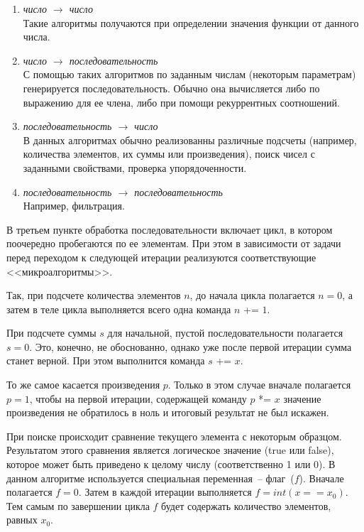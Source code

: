 \begin{enumerate}
	\item \emph{число $\rightarrow$ число}\\
	Такие алгоритмы получаются при определении значения функции от данного числа.
	\item \emph{число $\rightarrow$ последовательность}\\
	С помощью таких алгоритмов по заданным числам (некоторым параметрам) генерируется последовательность. Обычно она вычисляется либо по выражению для ее члена, либо при помощи рекуррентных соотношений.
	\item \emph{последовательность $\rightarrow$ число}\\
	В данных алгоритмах обычно реализованны различные подсчеты (например, количества элементов, их  суммы или произведения), поиск чисел с заданными свойствами, проверка упорядоченности.
	\item \emph{последовательность $\rightarrow$ последовательность}\\
	Например, фильтрация.
\end{enumerate}

В третьем пункте обработка последовательности включает цикл, в котором поочередно пробегаются по ее элементам. При этом в зависимости от задачи перед переходом к следующей итерации реализуются соответствующие <<микроалгоритмы>>.

Так, при подсчете количества элементов $n$, до начала  цикла полагается $n=0$, а затем в теле цикла выполняется всего одна команда $n$ += $1$.

При подсчете суммы $s$  для начальной, пустой последовательности полагается $s=0$. Это, конечно, не обоснованно, однако уже после первой итерации сумма станет верной. При этом выполнится команда $s$ += $x$.

То же самое касается произведения $p$. Только в этом случае вначале полагается $p=1$, чтобы на первой итерации, содержащей команду $p$ *= $x$ значение произведения не обратилось в ноль и итоговый результат не был искажен. 

При поиске происходит сравнение текущего элемента с некоторым образцом. Результатом этого сравнения является логическое значение (true или false), которое может быть приведено к целому числу (соответственно 1 или 0). 
В данном алгоритме используется специальная переменная~-- флаг~($f$). Вначале полагается $f=0$. Затем в каждой итерации выполняется $f=int(x == x_0)$. Тем самым по завершении цикла $f$ будет содержать количество элементов, равных $x_0$. 

